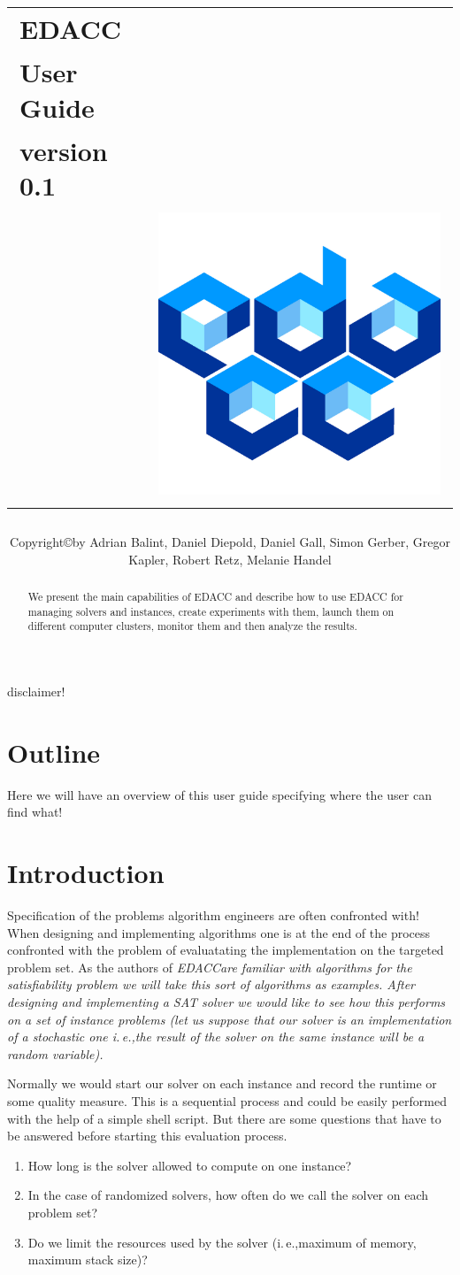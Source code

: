 \documentclass[twoside,a4paper]{refart}
\title{
\begin{tabular}{>{\raggedright}m{4cm}>{\raggedleft}m{10cm}}
EDACC \\User Guide \\version 0.1\\ & \includegraphics[scale=0.3]{edacclogo.jpg}
\end{tabular}
}
\author{Copyright\copyright by  Adrian Balint, Daniel Diepold, Daniel Gall, Simon Gerber, Gregor Kapler, Robert Retz, Melanie Handel}
\date{}
\newcommand{\ie}{i.\,e.,}
\newcommand{\edacc}{\slshape EDACC}
\newcounter{ex}
\begin{document}
\maketitle


\begin{abstract}
        We present the main capabilities of EDACC and describe how to use EDACC for managing solvers and instances, create experiments with them, launch them on different computer clusters, monitor them and then analyze the results. 
\end{abstract}

disclaimer!

\tableofcontents

\newpage


\section{Outline}
Here we will have an overview of this user guide specifying where the user can find what!

\section{Introduction}
Specification of the problems algorithm engineers are often confronted with! \\
When designing and implementing algorithms one is at the end of the process confronted with the problem of evaluatating the implementation on the targeted problem set. As the authors of \edacc are familiar with algorithms for the satisfiability problem we will take this sort of algorithms as examples. After designing and implementing a SAT solver we would like to see how this performs on a set of instance problems (let us suppose that our solver is an implementation of a stochastic one \ie the result of the solver on the same instance will be a random variable).

Normally we would start our solver on each instance and record the runtime or some quality measure. This is a sequential process and could be easily performed with the help of a simple shell script. But there are some questions that have to be answered before starting this evaluation process. 
\begin{enumerate}
\item How long is the solver allowed to compute on one instance?
\item In the case of randomized solvers, how often do we call the solver on each problem set?
\item Do we limit the resources used by the solver (\ie maximum of memory, maximum stack size)?
\end{enumerate}
\end{document}
